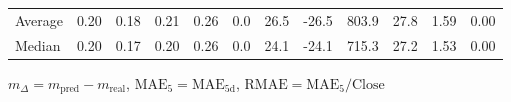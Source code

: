 \begin{threeparttable}
{\begin{tabular}{lrrrrrrrrrrr}
Average &          0.20 &          0.18 &          0.21 &        0.26 &                 0.0 &                26.5 &      -26.5 &               803.9 &             27.8 &            1.59 &                   0.00 \\
 Median &          0.20 &          0.17 &          0.20 &        0.26 &                 0.0 &                24.1 &      -24.1 &               715.3 &             27.2 &            1.53 &                   0.00 \\
\bottomrule
\end{tabular}
}
\begin{tablenotes}\footnotesize
\item $m_\Delta=m_{\text{pred}}-m_{\text{real}}$,
$\mathrm{MAE}_5=\mathrm{MAE}_{5\text{d}}$,
$\mathrm{RMAE}=\mathrm{MAE}_5/\text{Close}$
\end{tablenotes}
\end{threeparttable}
\endgroup

